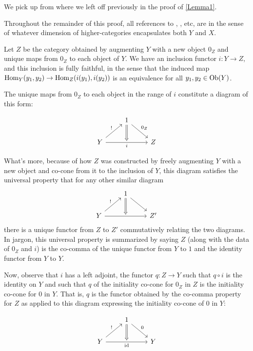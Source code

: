 \begin{proofEnd}
We pick up from where we left off previously in the proof of \cref{Lemma1}.

Throughout the remainder of this proof, all references to , , etc, are in the sense of whatever dimension of higher-categories encapsulates both $Y$ and $X$.

Let $Z$ be the category obtained by augmenting $Y$ with a new object $0_Z$ and unique maps from $0_Z$ to each object of $Y$. We have an inclusion functor $i : Y \to Z$, and this inclusion is fully faithful, in the sense that the induced map $\operatorname{Hom}_Y(y_1, y_2) \to \operatorname{Hom}_Z(i(y_1), i(y_2))$ is an equivalence for all $y_1, y_2 \in \operatorname{Ob}(Y)$.

The unique maps from $0_Z$ to each object in the range of $i$ constitute a diagram of this form:

\[\begin{tikzcd}
	& 1 \\
	Y && Z
	\arrow["\unique", from=2-1, to=1-2]
	\arrow["{0_Z}", from=1-2, to=2-3]
	\arrow[""{name=0, anchor=center}, "i"', from=2-1, to=2-3]
	\arrow[Rightarrow, from=1-2, to=0]
\end{tikzcd}\]

What's more, because of how $Z$ was constructed by freely augmenting $Y$ with a new object and co-cone from it to the inclusion of $Y$, this diagram satisfies the universal property that for any other similar diagram
\[\begin{tikzcd}
	& 1 \\
	Y && Z'
	\arrow["\unique", from=2-1, to=1-2]
	\arrow[from=1-2, to=2-3]
	\arrow[""{name=0, anchor=center}, from=2-1, to=2-3]
	\arrow[Rightarrow, from=1-2, to=0]
\end{tikzcd}\]
there is a unique functor from $Z$ to $Z'$ commutatively relating the two diagrams. In jargon, this universal property is summarized by saying $Z$ (along with the data of $0_Z$ and $i$) is the co-comma of the unique functor from $Y$ to $1$ and the identity functor from $Y$ to $Y$.

Now, observe that $i$ has a left adjoint, the functor $q : Z \to Y$ such that $q \circ i$ is the identity on $Y$ and such that $q$ of the initiality co-cone for $0_Z$ in $Z$ is the initiality co-cone for $0$ in $Y$. That is, $q$ is the functor obtained by the co-comma property for $Z$ as applied to this diagram expressing the initiality co-cone of $0$ in $Y$:

\[\begin{tikzcd}
	& 1 \\
	Y && Y
	\arrow["\unique", from=2-1, to=1-2]
	\arrow["{0}", from=1-2, to=2-3]
	\arrow[""{name=0, anchor=center}, "\id"', from=2-1, to=2-3]
	\arrow[Rightarrow, from=1-2, to=0]
\end{tikzcd}\]


\end{proofEnd}
